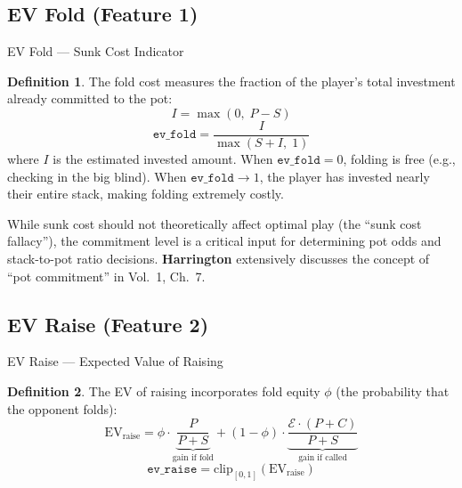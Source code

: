 \documentclass[11pt, a4paper]{article}
\theoremstyle{definition}
\newtheorem{definition}{Definition}[section]
\newcommand{\feature}[1]{\texttt{#1}}
\newcommand{\clip}[1]{\text{clip}_{[0,1]}\!\left(#1\right)}
\begin{document}
\subsection{EV Fold (Feature 1)}

\begin{featurebox}{EV Fold --- Sunk Cost Indicator}
\begin{definition}
The fold cost measures the fraction of the player's total investment already committed to the pot:
\begin{equation}
    I = \max(0,\; P - S)
\end{equation}
\begin{equation}
    \feature{ev\_fold} = \frac{I}{\max(S + I,\; 1)}
\end{equation}
where $I$ is the estimated invested amount.
When $\feature{ev\_fold} = 0$, folding is free (e.g., checking in the big blind). When $\feature{ev\_fold} \to 1$, the player has invested nearly their entire stack, making folding extremely costly.
\end{definition}
\end{featurebox}

\begin{refbox}
While sunk cost should not theoretically affect optimal play (the ``sunk cost fallacy''), the commitment level is a critical input for determining pot odds and stack-to-pot ratio decisions. \textbf{Harrington} \cite{harrington2004} extensively discusses the concept of ``pot commitment'' in Vol.~1, Ch.~7.
\end{refbox}

\subsection{EV Raise (Feature 2)}

\begin{featurebox}{EV Raise --- Expected Value of Raising}
\begin{definition}
The EV of raising incorporates fold equity $\phi$ (the probability that the opponent folds):
\begin{equation}
    \text{EV}_{\text{raise}} = \phi \cdot \underbrace{\frac{P}{P + S}}_{\text{gain if fold}} + (1 - \phi) \cdot \underbrace{\frac{\mathcal{E} \cdot (P + C)}{P + S}}_{\text{gain if called}}
\end{equation}
\begin{equation}
    \feature{ev\_raise} = \clip{\text{EV}_{\text{raise}}}
\end{equation}
\end{definition}
\end{featurebox}
\end{document}
